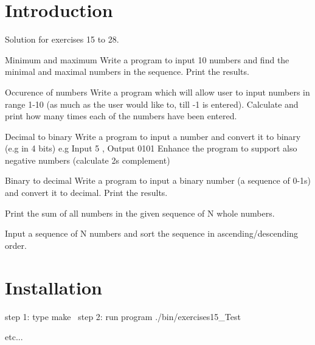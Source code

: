 \hypertarget{index_Introduction}{}\section{Introduction}\label{index_Introduction}
Solution for exercises 15 to 28.


\begin{DoxyEnumerate}
\item Minimum and maximum Write a program to input 10 numbers and find the minimal and maximal numbers in the sequence. Print the results.
\item Occurence of numbers Write a program which will allow user to input numbers in range 1-\/10 (as much as the user would like to, till -\/1 is entered). Calculate and print how many times each of the numbers have been entered.
\item Decimal to binary Write a program to input a number and convert it to binary (e.\+g in 4 bits) e.\+g Input 5 , Output 0101 Enhance the program to support also negative numbers (calculate 2\textquotesingle{}s complement)
\item Binary to decimal Write a program to input a binary number (a sequence of 0-\/1s) and convert it to decimal. Print the results.
\item Print the sum of all numbers in the given sequence of N whole numbers.
\item Input a sequence of N numbers and sort the sequence in ascending/descending order.
\end{DoxyEnumerate}\hypertarget{index_Installation}{}\section{Installation}\label{index_Installation}
step 1\+: type make~\newline
step 2\+: run program ./bin/exercises15\+\_\+Test

etc... 